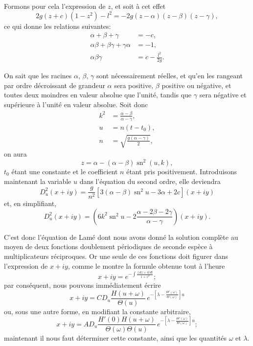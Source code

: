 \documentclass[11pt,leqno,oneside,letterpaper]{book}[2005/09/16]
\DeclareMathOperator{\sn}{sn}
\begin{document}
Formons pour cela l'expression de $z$, et soit \`a cet effet
\[
2g(z+c)(1-z^2) - l^2 = -2g(z-\alpha)(z-\beta)(z-\gamma),
\]
ce qui donne les relations suivantes:
\begin{align*}
\alpha + \beta + \gamma &= -c, \\
\alpha\beta + \beta\gamma + \gamma\alpha &= -1, \\
\alpha\beta\gamma &= c - \frac{l^2}{2g}.
\end{align*}

On sait que les racines $\alpha$, $\beta$, $\gamma$ sont n\'ecessairement r\'eelles, et qu'en les
rangeant par ordre d\'ecroissant de grandeur $\alpha$ sera positive, $\beta$ positive ou
n\'egative, et toutes deux moindres en valeur absolue que l'unit\'e, tandis que
$\gamma$ sera n\'egative et sup\'erieure \`a l'unit\'e en valeur absolue. Soit donc
\begin{align*}
k^2 &= \frac{\alpha - \beta}{\alpha - \gamma}, \\
  u &= n(t - t_0), \\
  n &= \sqrt{ \frac{ g(\alpha - \gamma) }{2} },
\end{align*}
on aura
\[
z = \alpha - (\alpha - \beta) \sn^2 (u, k),
\]
$t_0$ \'etant une constante et le coefficient $n$ \'etant pris positivement. Introduisons
maintenant la variable $u$ dans l'\'equation du second ordre, elle deviendra
\[
D_u^2(x+iy) = \frac{g}{n^2} \left[3(\alpha - \beta)\sn^2 u - 3\alpha + 2c \right](x + iy)
\]
et, en simplifiant,
\[
D_u^2(x+iy) = \left( 6k^2\sn^2 u - 2\frac{\alpha - 2\beta - 2\gamma}{\alpha - \gamma} \right) (x+iy).
\]

C'est donc l'\'equation de Lam\'e dont nous avons donn\'e la solution
com\-pl\`ete au moyen de deux fonctions doublement p\'eriodiques de seconde
esp\`ece \`a multiplicateurs r\'eciproques. Or une seule de ces fonctions doit
figurer dans l'expression de $x+iy$, comme le montre la formule obtenue
tout \`a l'heure
\[
x + iy = e^{\textstyle -\int \frac{z \,dz + il \,dt}{1 + z^2}};
\]
par cons\'equent, nous pouvons imm\'ediatement \'ecrire
\[
x + iy = CD_u \frac{H(u+\omega)}{\Theta(u)}\,
  e^{ -\left[ \lambda - \frac{\Theta'(\omega)}{\Theta(\omega)} \right] u}
\]
ou, sous une autre forme, en modifiant la constante arbitraire,
\[
x + iy = AD_u \frac{H'(0) H(u + \omega)}{\Theta(\omega)\Theta(u)}\,
  e^{ -\left[ \lambda - \frac{\Theta'(\omega)}{\Theta(\omega)} \right] u};
\]
maintenant il nous faut d\'eterminer cette constante, ainsi que les
quantit\'es $\omega$ et $\lambda$.
\end{document}
